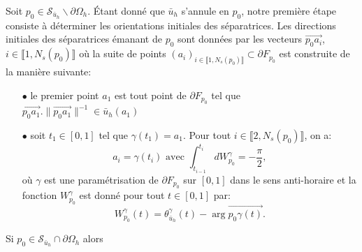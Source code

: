 Soit $p_0\in\mathcal{S}_{\bar{u}_h}\backslash\partial\Omega_h$. Étant donné que $\bar{u}_h$ s'annule en $p_0$, notre première étape consiste à déterminer les orientations initiales des séparatrices. Les directions initiales des séparatrices émanant de $p_0$ sont données par les vecteurs $\overrightarrow{p_0a_i}$, $i\in\llbracket 1, N_s(p_0) \rrbracket$ où la suite de points $(a_i)_{i\in\llbracket 1, N_s(p_0)\rrbracket}\subset\partial F_{p_0}$ est construite de la manière suivante:\\
\begin{itemize}
    \item[$\bullet$] le premier point $a_1$ est tout point de $\partial F_{p_0}$ tel que $\overrightarrow{p_0a_1}.\|\overrightarrow{p_0a_1}\|^{-1}\in\bar{u}_h(a_1)$\\
    \item[$\bullet$] soit $t_1\in[0, 1]$ tel que $\gamma(t_1)=a_1$. Pour tout $i\in\llbracket 2, N_s(p_0)\rrbracket$, on a:
    $$
    a_i=\gamma(t_i)\mbox{ avec }\int_{t_{i-1}}^{t_i}dW_{p_0}^\gamma=-\frac{\pi}{2},
    $$
    où $\gamma$ est une paramétrisation de $\partial F_{p_0}$ sur $[0, 1]$ dans le sens anti-horaire et la fonction $W^\gamma_{p_0}$ est donné pour tout $t\in[0, 1]$ par:
    $$
    W_{p_0}^\gamma(t)=\theta^\gamma_{\bar{u}_h}(t)-\arg \overrightarrow{p_0\gamma(t)}.
    $$
\end{itemize}
Si $p_0\in\mathcal{S}_{\bar{u}_h}\cap\partial\Omega_h$ alors

